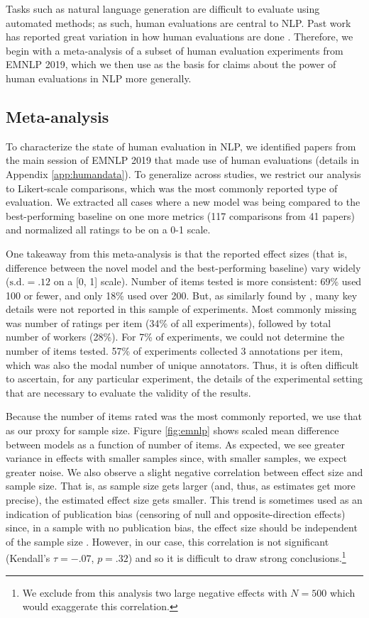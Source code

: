 \documentclass[11pt,a4paper]{article}
\begin{document}
Tasks such as natural language generation are difficult to evaluate using 
automated methods; as such, human evaluations 
are
central to
NLP. 
Past work has reported
great variation in how
human evaluations are done
\citep{van2019best}. Therefore, we 
begin with
a meta-analysis of a subset of human evaluation experiments from EMNLP 2019, which we then use as the basis for claims about the power of human evaluations in NLP more generally.

\subsection{Meta-analysis}
\label{sec:meta}

To characterize the state of human evaluation in NLP, we identified papers from the main session of EMNLP 2019 that made use of human evaluations (details in Appendix \ref{app:humandata}). To generalize across studies, we restrict 
our analysis
to 
Likert-scale comparisons, which was the most commonly reported type of evaluation. We extracted all 
cases where a new model was being 
compared to
the best-performing baseline on one more metrics
(117 comparisons from 41 papers)
and  normalized all ratings to be on a 0-1 scale.

One
takeaway from this meta-analysis 
is that the
reported effect sizes
(that is, difference between the novel model and the best-performing baseline)
vary widely ($\textrm{s.d.}=.12$ on a [0, 1] scale).
Number of items tested is more consistent: 69\% used 100 or fewer, and only 18\% used over 200. But, as similarly found by \citet{van2019best}, many key details were not reported in this sample of experiments.
Most commonly missing was number of ratings per item (34\% of all experiments),
followed by total number of workers
(28\%). 
For 7\% of experiments, we could not determine the number of items tested. 
57\% of experiments collected 3 annotations per item, which was also the modal number of unique annotators. Thus, it is often difficult to ascertain, for any particular experiment, the details of the experimental setting that are necessary to evaluate the validity of the results.

Because the number of items rated was the most commonly reported, we use that as our proxy for sample size. Figure \ref{fig:emnlp} shows
scaled
mean
difference between models
as a function of
number of items. 
As expected, we see greater variance in effects with smaller samples since, with smaller samples, we expect greater noise. We also observe a slight negative correlation between effect size and sample size. That is, as sample size gets larger (and, thus, as estimates get more precise), the estimated effect size gets smaller. This trend is sometimes used as an indication of publication bias (censoring of null and opposite-direction effects) since, in a sample with no publication bias, the effect size should be independent of the sample size \cite{begg1994operating}. However, in our case, this correlation is not significant (Kendall's $\tau = -.07$, $p = .32$) and so it is difficult to draw strong conclusions.\footnote{We exclude from this analysis two large negative effects with $N=500$ which would exaggerate this correlation.}
\end{document}
